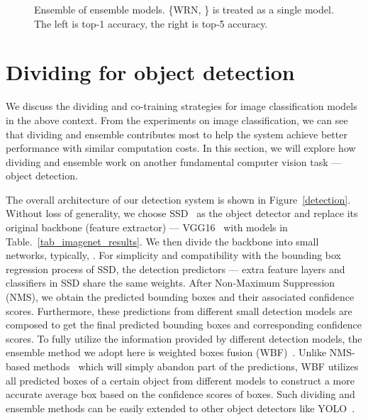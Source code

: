\documentclass[lettersize,journal]{IEEEtran}
\begin{document}
\begin{figure}[tbp]
	\centering
	
\caption{Ensemble of ensemble models.
		\{WRN, \} is treated as a single model.
	The left is top-1 accuracy, the right is top-5 accuracy.}
	\label{fig_enen}
\end{figure}




\section{Dividing for object detection}
We discuss the dividing and co-training strategies for
image classification models in the above context.
From the experiments on image classification, we can see that dividing and ensemble 
contributes most to help the system achieve better performance
with similar computation costs.
In this section, we will explore how dividing and ensemble
work on another fundamental computer vision task --- object detection.

The overall architecture of our detection system is shown in Figure~\ref{detection}.
Without loss of generality, we choose SSD~\cite{2016_ssd} as the object detector and
replace its original backbone (feature extractor) ---
VGG16~\cite{2014_VGGNet} with models in Table.~\ref{tab_imagenet_results}.
We then divide the backbone into  small networks, typically, .
For simplicity and compatibility with the bounding box regression process of SSD,
the detection predictors --- extra feature layers and classifiers in SSD
share the same weights.
After Non-Maximum Suppression (NMS),
we obtain the predicted bounding boxes and their associated confidence scores.
Furthermore, these predictions from different small detection models are composed
to get the final predicted bounding boxes and corresponding confidence scores.
To fully utilize the information provided by different detection models,
the ensemble method we adopt here is weighted boxes fusion (WBF)~\cite{2021_wbf}.
Unlike NMS-based methods~\cite{GarciaH20,2017_softnms}
which will simply abandon part of the predictions,
WBF utilizes all predicted boxes of a certain object from different models
to construct a more accurate average box based on the confidence scores of boxes.
Such dividing and ensemble methods can be easily extended to other object detectors
like YOLO~\cite{2016_YOLO}.
\end{document}
